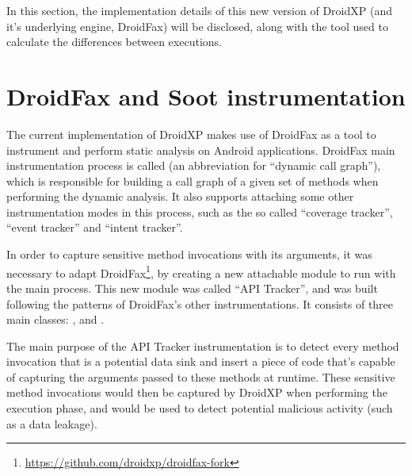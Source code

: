 
In this section, the implementation details of this new version of DroidXP (and it's underlying engine, DroidFax) will be disclosed, along with the tool used to calculate the differences between executions.

\section{DroidFax and Soot instrumentation}

The current implementation of DroidXP makes use of DroidFax as a tool to instrument and perform static analysis on Android applications. DroidFax main instrumentation process is called  (an abbreviation for ``dynamic call graph''), which is responsible for building a call graph of a given set of methods when performing the dynamic analysis. It also supports attaching some other instrumentation modes in this process, such as the so called ``coverage tracker'', ``event tracker'' and ``intent tracker''.

In order to capture sensitive method invocations with its arguments, it was necessary to adapt DroidFax\footnote{\url{https://github.com/droidxp/droidfax-fork}}, by creating a new attachable module to run with the main process. This new module was called ``API Tracker'', and was built following the patterns of DroidFax's other instrumentations. It consists of three main classes: ,  and .

The main purpose of the API Tracker instrumentation is to detect every method invocation that is a potential data sink and insert a piece of code that's capable of capturing the arguments passed to these methods at runtime. These sensitive method invocations would then be captured by DroidXP when performing the execution phase, and would be used to detect potential malicious activity (such as a data leakage).

